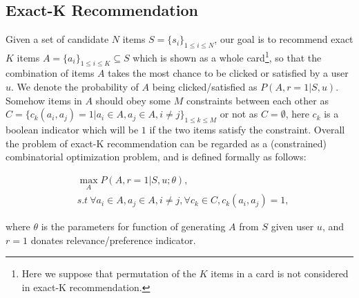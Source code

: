 \subsection{Exact-K Recommendation}
\label{sec:problem_definition}
Given a set of candidate $N$ items $S=\{s_i\}_{1\le i\le N}$,
our goal is to recommend exact $K$ items $A=\{a_i\}_{1\le i\le K}\subseteq S$ which is shown as a whole card\footnote{Here we suppose that permutation of the $K$ items in a card is not considered in exact-K recommendation.},
so that the combination of items $A$ takes the most chance to be clicked or satisfied by a user $u$.
We denote the probability of $A$ being clicked/satisfied as $P(A,r=1|S,u)$.
Somehow items in $A$ should obey some $M$ constraints between each other as $C=\{c_k(a_i,a_j)=1|a_i\in A,a_j\in A,i\neq j\}_{1\le k\le M}$ or not as $C=\emptyset$, here $c_k$ is a boolean indicator
which will be $1$ if the two items satisfy the constraint.
Overall the problem of exact-K recommendation can be regarded as a (constrained) combinatorial optimization problem,
and is defined formally as follows:
\begin{small}
\begin{eqnarray}
	\label{eq:objective}
	& \max\limits_{A} P(A,r=1|S,u;\theta), \\
	\label{eq:constraints}
	& s.t\ \forall a_i\in A,a_j\in A,i\neq j, \forall c_k\in C, c_{k}(a_i,a_j)=1,
\end{eqnarray}
\end{small}
where $\theta$ is the parameters for function of generating $A$ from $S$ given user $u$, and $r=1$ donates relevance/preference indicator.

